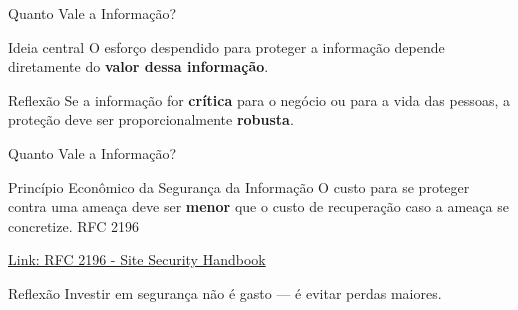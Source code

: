 \begin{frame}{Quanto Vale a Informação?}

    \begin{block}{Ideia central}
        O esforço despendido para proteger a informação depende diretamente do \textbf{valor dessa informação}.
    \end{block}

    \centering


    \vspace{0.5cm}

    \begin{alertblock}{Reflexão}
        Se a informação for \textbf{crítica} para o negócio ou para a vida das pessoas, a proteção deve ser proporcionalmente \textbf{robusta}.
    \end{alertblock}

\end{frame}

\begin{frame}{Quanto Vale a Informação?}

    \begin{block}{Princípio Econômico da Segurança da Informação}
        O custo para se proteger contra uma ameaça deve ser \textbf{menor} que o custo de recuperação caso a ameaça se concretize. RFC 2196
    \end{block}

    \href{https://datatracker.ietf.org/doc/html/rfc2196}{Link: RFC 2196 - Site Security Handbook}

    \vspace{0.5cm}

    \begin{alertblock}{Reflexão}
        Investir em segurança não é gasto — é evitar perdas maiores.
    \end{alertblock}

\end{frame}

